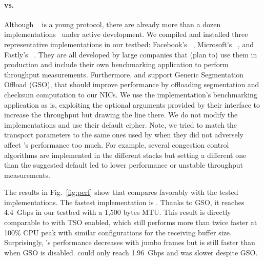 \paragraph{\tcpls vs. \quic}
Although \quic~\cite{draft-ietf-quic-transport} is a young protocol, there are
already more than a dozen implementations~\cite{marx2020same,quicimplem,yang2020making} under active
development. We compiled and installed three representative \quic implementations in our testbed: Facebook's \mvfst~\cite{mvfst-github,Joras_mvfst}, Microsoft's \msquic~\cite{msquic-github}, and Fastly's
\quicly~\cite{quicly-github}. They are all developed by large companies that (plan to) use them in production and include their own benchmarking application to perform throughput measurements. Furthermore, \mvfst and \quicly support Generic Segmentation Offload (GSO), that should improve performance by offloading \udp segmentation and checksum computation to our NICs. We use the
implementation's benchmarking application as is, exploiting the optional
arguments provided by their interface to increase the throughput but drawing the
line there. We do not modify the \quic implementations and use their default
cipher. Note, we tried to match the transport parameters to the same ones
used by \tcpls when they did not adversely affect \quic's performance too much. For example, several congestion control algorithms are implemented in the different \quic stacks but setting a different one than the suggested default led to lower performance or unstable throughput measurements.

The results in Fig.~\ref{fig:perf} show that \tcpls compares favorably
with the tested \quic implementations. The fastest \quic implementation is
\quicly. Thanks to GSO, it reaches 4.4~Gbps in our testbed with a 1,500 bytes
MTU. This result is directly comparable to \tcpls with TSO enabled, which still
performs more than twice faster at 100\% CPU peak with similar configurations
for the receiving buffer size. Surprisingly, \quicly's performance decreases with
jumbo frames but is still faster than when GSO is disabled.
\msquic could only reach 1.96~Gbps and \mvfst was slower despite GSO.




